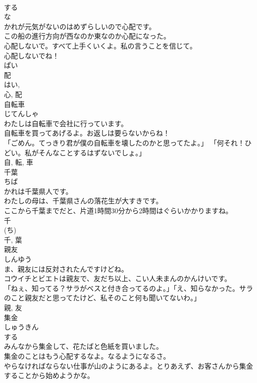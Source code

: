 \documentclass[8pt]{extreport}
\begin{document}
\begin{CJK}{UTF8}{min}
\\	する 
\\	な 
\\	かれが元気がないのはめずらしいので心配です。	
\\	この船の進行方向が西なのか東なのか心配になった。	
\\	心配しないで。すべて上手くいくよ。私の言うことを信じて。	
\\	心配しないでね！	
\\	ぱい 
\\	配 
\\	はい, 
\\	心, 配	
\\	自転車	
\\	じてんしゃ	
\\	わたしは自転車で会社に行っています。	
\\	自転車を買ってあげるよ。お返しは要らないからね！	
\\	「ごめん。てっきり君が僕の自転車を壊したのかと思ってたよ。」 「何それ！ひどい。私がそんなことするはずないでしょ。」	
\\	自, 転, 車	
\\	千葉	
\\	ちば	
\\	かれは千葉県人です。	
\\	わたしの母は、千葉県さんの落花生が大すきです。	
\\	ここから千葉までだと、片道1時間30分から2時間はぐらいかかりますね。	
\\	千 
\\	(ち) 
\\	千, 葉	
\\	親友	
\\	しんゆう	
\\	ま、親友には反対されたんですけどね。	
\\	コウイチとビエトは親友で、友だち以上、こい人未まんのかんけいです。	
\\	「ねぇ、知ってる？サラがベスと付き合ってるのよ。」「え、知らなかった。サラのこと親友だと思ってたけど、私そのこと何も聞いてないわ。」	
\\	親, 友	
\\	集金	
\\	しゅうきん	
\\	する 
\\	みんなから集金して、花たばと色紙を買いました。	
\\	集金のことはもう心配するなよ。なるようになるさ。	
\\	やらなければならない仕事が山のようにあるよ。とりあえず、お客さんから集金することから始めようかな。	

\end{CJK}
\end{document}
